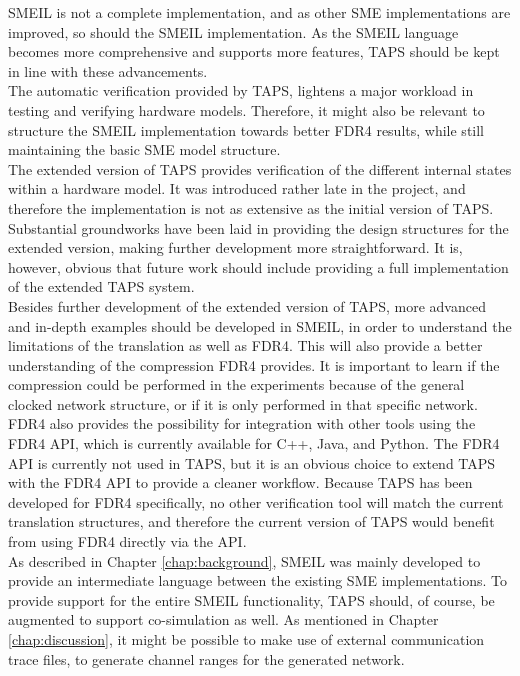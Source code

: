 
SMEIL is not a complete implementation, and as other SME implementations are improved, so should the SMEIL implementation. As the SMEIL language becomes more comprehensive and supports more features, TAPS should be kept in line with these advancements.\\
The automatic verification provided by TAPS, lightens a major workload in testing and verifying hardware models. Therefore, it might also be relevant to structure the SMEIL implementation towards better FDR4 results, while still maintaining the basic SME model structure. \\

The extended version of TAPS provides verification of the different internal states within a hardware model. It was introduced rather late in the project, and therefore the implementation is not as extensive as the initial version of TAPS. Substantial groundworks have been laid in providing the design structures for the extended version, making further development more straightforward. It is, however, obvious that future work should include providing a full implementation of the extended TAPS system. \\

Besides further development of the extended version of TAPS, more advanced and in-depth examples should be developed in SMEIL, in order to understand the limitations of the translation as well as FDR4. This will also provide a better understanding of the compression FDR4 provides. It is important to learn if the compression could be performed in the experiments because of the general clocked network structure, or if it is only performed in that specific network. \\

FDR4 also provides the possibility for integration with other tools using the FDR4 API, which is currently available for C++, Java, and Python. The FDR4 API is currently not used in TAPS, but it is an obvious choice to extend TAPS with the FDR4 API to provide a cleaner workflow. Because TAPS has been developed for FDR4 specifically, no other verification tool will match the current translation structures, and therefore the current version of TAPS would benefit from using FDR4 directly via the API.\\

As described in Chapter \ref{chap:background}, SMEIL was mainly developed to provide an intermediate language between the existing SME implementations.
To provide support for the entire SMEIL functionality, TAPS should, of course, be augmented to support co-simulation as well. As mentioned in Chapter \ref{chap:discussion}, it might be possible to make use of external communication trace files, to generate channel ranges for the generated \cspm{} network.\\


